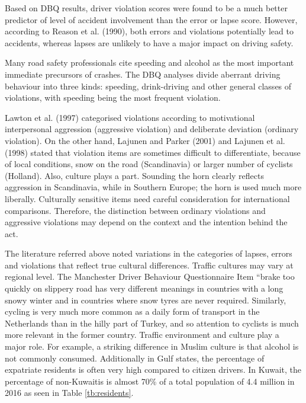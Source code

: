 \documentclass[preprint,12pt,a4paper,authoryear]{elsarticle}
\begin{document}
\begin{linenumbers}
Based on DBQ results, driver violation scores were found to be a much better predictor of level of accident involvement than the error or lapse score. However, according to Reason et al. (1990), both errors and violations potentially lead to accidents, whereas lapses are unlikely to have a major impact on driving safety.    

Many road safety professionals cite speeding and alcohol as the most important immediate precursors of crashes. The DBQ analyses divide aberrant driving behaviour into three kinds: speeding, drink-driving and other general classes of violations, with speeding being the most frequent violation. 

Lawton et al. (1997) categorised violations according to motivational interpersonal aggression (aggressive violation) and deliberate deviation (ordinary violation). On the other hand, Lajunen and Parker (2001) and Lajunen et al. (1998) stated that violation items are sometimes difficult to differentiate, because of local conditions, snow on the road (Scandinavia) or larger number of cyclists (Holland). Also, culture plays a part. Sounding the horn clearly reflects aggression in Scandinavia, while in Southern Europe; the horn is used much more liberally. Culturally sensitive items need careful consideration for international comparisons. Therefore, the distinction between ordinary violations and aggressive violations may depend on the context and the intention behind the act.   

The literature referred above noted variations in the categories of lapses, errors and violations that reflect true cultural differences. Traffic cultures may vary at regional level. The Manchester Driver Behaviour Questionnaire Item “brake too quickly on slippery road has very different meanings in countries with a long snowy winter and in countries where snow tyres are never required. Similarly, cycling is very much more common as a daily form of transport in the Netherlands than in the hilly part of Turkey, and so attention to cyclists is much more relevant in the former country. Traffic environment and culture play a major role. For example, a striking difference in Muslim culture is that alcohol is not commonly consumed.  Additionally in Gulf states, the percentage of expatriate residents is often very high compared to citizen drivers. In Kuwait, the percentage of non-Kuwaitis is almost 70\% of a total population of 4.4 million in 2016 as seen in Table \ref{tb:residents}.


\end{linenumbers}
\end{document}
